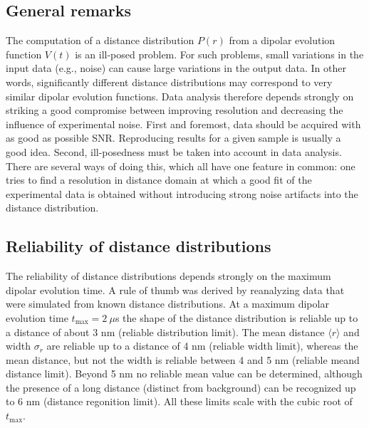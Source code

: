 \documentclass{article}
\begin{document}
\subsection{General remarks}
The computation of a distance distribution $P(r)$ from a dipolar evolution function
$V(t)$ is an ill-posed problem. For such problems, small variations in the
input data (e.g., noise) can cause large variations in the output data. In other
words, significantly different distance distributions may correspond to very similar
dipolar evolution functions. Data analysis therefore depends strongly
on striking a good compromise between improving resolution and decreasing the
influence of experimental noise. First
and foremost, data should be acquired with as good as possible SNR. Reproducing
results for a given sample is usually a good idea. Second,
ill-posedness must be taken into account in data analysis. There are several
ways of doing this, which all have one feature in common: one tries to find a
resolution in distance domain at which a good fit of the experimental data is
obtained without introducing strong noise artifacts into the distance distribution.

\subsection{Reliability of distance distributions}
\label{reliability}
The reliability of distance distributions depends strongly on the maximum dipolar evolution time. 
A rule of thumb was derived by reanalyzing data that were simulated from known distance distributions.
At a maximum dipolar evolution time $t_\mathrm{max} = 2 \ \mu$s the shape of the distance distribution is
reliable up to a distance of about 3 nm (reliable distribution limit). The mean distance $\langle r \rangle$ and width $\sigma_r$ are 
reliable up to a distance of 4 nm (reliable width limit), whereas the mean distance, but not the width is reliable between 4 and 5 nm
(reliable meand distance limit). Beyond 5 nm no reliable mean value can be determined, although the presence of a long distance 
(distinct from background) can be recognized up to 6 nm (distance regonition limit). All these limits scale with the cubic root of $t_\mathrm{max}$.
\end{document}

